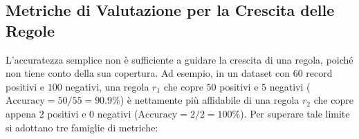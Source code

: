 \begin{table}[H]
\centering
\caption{Confronto tra le strategie di crescita delle regole \textit{General-to-Specific} e \textit{Specific-to-General}.}
\label{tab:dm-rule-growth}
\small
{}
\end{table}

\FloatBarrier
\subsection{Metriche di Valutazione per la Crescita delle Regole}
\label{subsec:dm-rule-metrics}

L'accuratezza semplice non \`e sufficiente a guidare la crescita di una regola, poich\'e non tiene conto della sua copertura. Ad esempio, in un dataset con $60$ record positivi e $100$ negativi, una regola $r_1$ che copre $50$ positivi e $5$ negativi ($\text{Accuracy} = 50/55 = 90.9\%$) \`e nettamente pi\`u affidabile di una regola $r_2$ che copre appena $2$ positivi e $0$ negativi ($\text{Accuracy} = 2/2 = 100\%$). Per superare tale limite si adottano tre famiglie di metriche:

